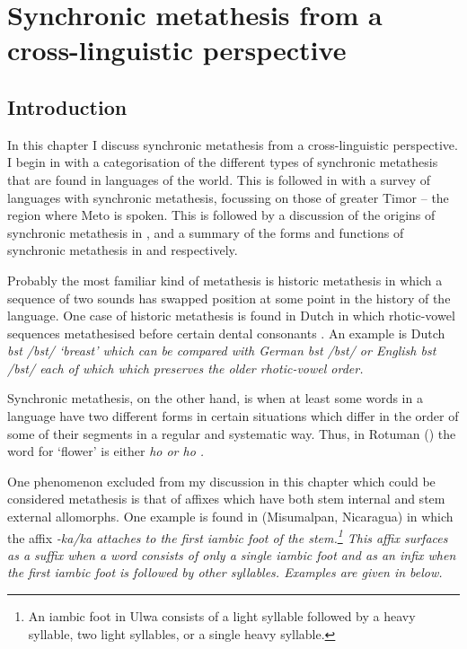 \chapter{Synchronic metathesis from a cross-linguistic perspective} \label{ch:SynchMet}

\section{Introduction}
In this chapter I discuss synchronic metathesis
from a cross-linguistic perspective.
I begin in  with a categorisation
of the different types of synchronic metathesis
that are found in languages of the world.
This is followed in  with a survey of
languages with synchronic metathesis, focussing on those
of greater Timor -- the region where Meto is spoken.
This is followed by a discussion of the origins of
synchronic metathesis in , and
a summary of the forms and functions of synchronic metathesis
in  and  respectively.

Probably the most familiar kind of metathesis is historic metathesis
in which a sequence of two sounds has swapped
position at some point in the history of the language.
One case of historic metathesis is found in Dutch
in which rhotic-vowel sequences metathesised
before certain dental consonants \citep[108]{va17}.
An example is Dutch \it{bst} /bst/ `breast'
which can be compared with German \it{bst} /bst/
or English \it{bst} /bst/ each of which
which preserves the older rhotic-vowel order.

Synchronic metathesis, on the other hand,
is when at least some words in a language
have two different forms in certain situations
which differ in the order of some of their segments in a regular and systematic way.
Thus, in Rotuman () the word for `flower'
is either \it{ho} or \it{ho} \citep[14]{ch40}.

One phenomenon excluded from my discussion in this chapter
which could be considered metathesis
is that of affixes which have both stem internal and stem external allomorphs.
One example is found in  (Misumalpan, Nicaragua)
in which the  affix \it{-ka/\<ka\>}
attaches to the first iambic foot of the stem.\footnote{
		An iambic foot in Ulwa consists of a light syllable followed by a heavy syllable,
		two light syllables, or a single heavy syllable.}
This affix surfaces as a suffix when a word consists of only a single iambic foot
and as an infix when the first iambic foot is followed by other syllables.
Examples are given in  below.


